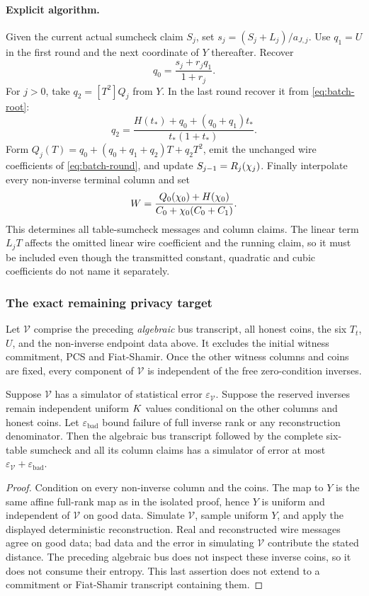 \paragraph{Explicit algorithm.} Given the current actual sumcheck claim $S_j$, set $s_j=(S_j+L_j)/a_{J,j}$. Use $q_1=U$ in the first round and the next coordinate of $Y$ thereafter. Recover
\[
 q_0=\frac{s_j+r_jq_1}{1+r_j}.
\]
For $j>0$, take $q_2=[T^2]Q_j$ from $Y$. In the last round recover it from \eqref{eq:batch-root}:
\[
 q_2=\frac{H(t_*)+q_0+(q_0+q_1)t_*}{t_*(1+t_*)}.
\]
Form $Q_j(T)=q_0+(q_0+q_1+q_2)T+q_2T^2$, emit the unchanged wire coefficients of \eqref{eq:batch-round}, and update $S_{j-1}=R_j(\chi_j)$. Finally interpolate every non-inverse terminal column and set
\[
 W=\frac{Q_0(\chi_0)+H(\chi_0)}{C_0+\chi_0(C_0+C_1)}.
\]
This determines all table-sumcheck messages and column claims. The linear term $L_jT$ affects the omitted linear wire coefficient and the running claim, so it must be included even though the transmitted constant, quadratic and cubic coefficients do not name it separately.

\subsubsection{The exact remaining privacy target}

Let $\mathcal V$ comprise the preceding \emph{algebraic} bus transcript, all honest coins, the six $T_t$, $U$, and the non-inverse endpoint data above. It excludes the initial witness commitment, PCS and Fiat-Shamir. Once the other witness columns and coins are fixed, every component of $\mathcal V$ is independent of the free zero-condition inverses.

\begin{proposition}\label{prop:full-table-conditional}
Suppose $\mathcal V$ has a simulator of statistical error $\varepsilon_{\mathcal V}$. Suppose the reserved inverses remain independent uniform $K$ values conditional on the other columns and honest coins. Let $\varepsilon_{\mathrm{bad}}$ bound failure of full inverse rank or any reconstruction denominator. Then the algebraic bus transcript followed by the complete six-table sumcheck and all its column claims has a simulator of error at most $\varepsilon_{\mathcal V}+\varepsilon_{\mathrm{bad}}$.
\end{proposition}
\begin{proof}
Condition on every non-inverse column and the coins. The map to $Y$ is the same affine full-rank map as in the isolated proof, hence $Y$ is uniform and independent of $\mathcal V$ on good data. Simulate $\mathcal V$, sample uniform $Y$, and apply the displayed deterministic reconstruction. Real and reconstructed wire messages agree on good data; bad data and the error in simulating $\mathcal V$ contribute the stated distance. The preceding algebraic bus does not inspect these inverse coins, so it does not consume their entropy. This last assertion does not extend to a commitment or Fiat-Shamir transcript containing them.
\end{proof}

